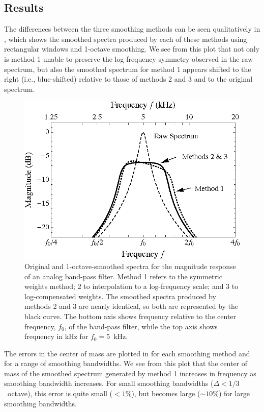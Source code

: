 \subsection{Results} \label{sec:A3_Smoothing_Weights:Results}
The differences between the three smoothing methods can be seen qualitatively in , which shows the smoothed spectra produced by each of these methods using rectangular windows and 1-octave smoothing.
We see from this plot that not only is method 1 unable to preserve the log-frequency symmetry observed in the raw spectrum, but also the smoothed spectrum for method 1 appears shifted to the right (i.e., blue-shifted) relative to those of methods 2 and 3 and to the original spectrum.

\begin{figure}[t]
    \centering
    \includegraphics[width=0.6\columnwidth]{a3_smoothing_weights/figures/SmoothedBPFExample.eps}
    \caption[Original and smoothed magnitude responses of a band-pass filter.]{
    Original and 1-octave-smoothed spectra for the magnitude response of an analog band-pass filter.
Method 1 refers to the symmetric weights method; 2 to interpolation to a log-frequency scale; and 3 to log-compensated weights.
The smoothed spectra produced by methods 2 and 3 are nearly identical, so both are represented by the black curve.
The bottom axis shows frequency relative to the center frequency, $f_0$, of the band-pass filter, while the top axis shows frequency in kHz for $f_0 = 5$~kHz.}
    \label{fig:A3_Smoothing_Weights:SmoothedBPFExample}
\end{figure}

The errors in the center of mass are plotted in  for each smoothing method and for a range of smoothing bandwidths.
We see from this plot that the center of mass of the smoothed spectrum generated by method 1 increases in frequency as smoothing bandwidth increases.
For small smoothing bandwidths ($\Delta < 1/3$~octave), this error is quite small ($< 1\%$), but becomes large ($\sim 10\%$) for large smoothing bandwidths.

